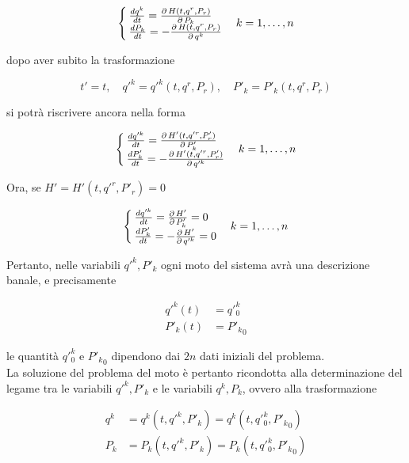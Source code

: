 \begin{equation*}
\begin{cases}
\frac{dq^k}{dt}= \frac{\operatorname{\partial} H (t, q^r, P_r)}{\operatorname{\partial} P_k}\\
\frac{dP_k}{dt}= - \frac{\operatorname{\partial} H (t, q^r, P_r)}{\operatorname{\partial} q^k}
\end{cases}
k=1, \dots , n
\end{equation*}

dopo aver subito la trasformazione

\begin{equation*}
t' = t, \quad q'^k = q'^k (t, q^r, P_r), \quad P'_k = P'_k (t, q^r, P_r)
\end{equation*}

si potrà riscrivere ancora nella forma

\begin{equation*}
\begin{cases}
\frac{dq'^k}{dt}= \frac{\operatorname{\partial} H' (t, q'^r, P'_r)}{\operatorname{\partial} P'_k}\\
\frac{dP'_k}{dt}= - \frac{\operatorname{\partial} H' (t, q'^r, P'_r)}{\operatorname{\partial} q'^k}
\end{cases}
k = 1, \dots , n
\end{equation*}

Ora, se $ H' = H' (t, q'^r, P'_r) = 0 $

\begin{equation*}
\begin{cases}
\frac{dq'^k}{dt}= \frac{\operatorname{\partial} H'}{\operatorname{\partial} P'_k} = 0\\
\frac{dP'_k}{dt}= - \frac{\operatorname{\partial} H'}{\operatorname{\partial} q'^k} = 0
\end{cases}
k = 1, \dots , n
\end{equation*}

Pertanto, nelle variabili $ q'^k, P'_k $ ogni moto del sistema avrà una descrizione banale, e precisamente

\begin{align*}
q'^k (t) & = q'^k_0 \\
P'_k (t) & = {P'_k}_0
\end{align*}

le quantità $ q'^k_0 $ e $ {P'_k}_0 $ dipendono dai $ 2n $ dati iniziali del problema.\\
La soluzione del problema del moto è pertanto ricondotta alla determinazione del legame tra le variabili $ q'^k, P'_k $ e le variabili $ q^k, P_k $, ovvero alla trasformazione

\begin{eqnarray*}
q^k &= q^k(t,q'^k,P'_k) = q^k(t,q'^k_0,{P'_k}_0)\\
P_k &= P_k(t,q'^k,P'_k) = P_k(t,q'^k_0,{P'_k}_0)
\end{eqnarray*}

